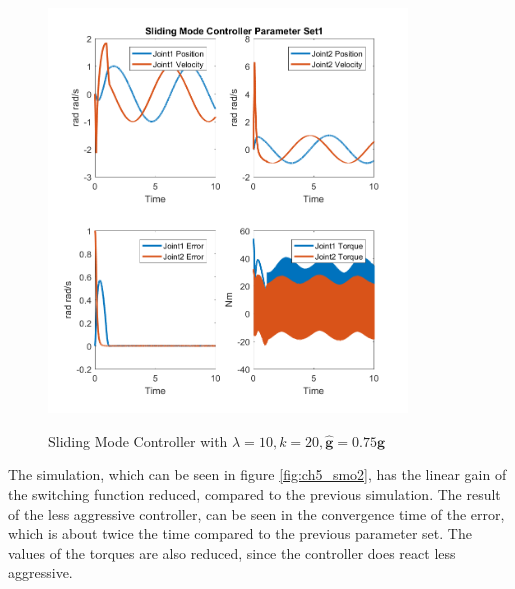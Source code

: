 \begin{figure}[]
	\centering
	\includegraphics[width=0.85\textwidth]{pics/SlidingModeControllerParameterSet1.png}\\
	\caption{Sliding Mode Controller with $\lambda = 10, k=20,\hat{\mathbf{g}}=0.75\mathbf{g}$  }
	\label{fig:ch5_smo1}
\end{figure}

The simulation, which can be seen in figure \ref{fig:ch5_smo2}, has the linear gain of the switching function reduced, compared to the previous simulation. The result of the less aggressive controller, can be seen in the convergence time of the error, which is about twice the time compared to the previous parameter set. The values of the torques are also reduced, since the controller does react less aggressive.

